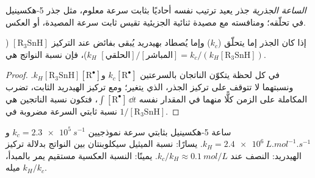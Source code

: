 \begin{definition}\label{def:b3:radicals-carbenes:radical-clock}
\emph{الساعة الجذرية} جذر يعيد ترتيب نفسه
أحاديًا بثابت سرعة معلوم، مثل جذر 5-هكسينيل في
تحلّقه؛ ومنافسته مع مصيدة ثنائية الجزيئية تقيس ثابت سرعة
المصيدة، أو العكس.
\end{definition}

\begin{proposition}\label{prop:b3:radicals-carbenes:clock}
إذا كان الجذر إما يتحلّق ($k_c$) وإما يُصطاد بهيدريد يُبقى بفائض عند
التركيز $[\mathrm{R_3SnH}]$ ($k_H$)، فإن نسبة النواتج هي
$[\text{الحلقي}]/[\text{المباشر}] = k_c/(k_H[\mathrm{R_3SnH}])$.
\end{proposition}

\begin{proof}
في كل لحظة يتكوّن الناتجان بالسرعتين $k_c[\mathrm R^\bullet]$ و$k_H[\mathrm{R_3SnH}][\mathrm R^\bullet]$. ونسبتهما
لا تتوقف على تركيز الجذر، الذي يتغير؛ ومع تركيز الهيدريد
الثابت، تضرب المكاملة على الزمن كلًّا منهما في المقدار نفسه
$\int[\mathrm R^\bullet]\,\dd t$، فتكون نسبة الناتجين هي نسبة ثابتي السرعة
مضروبة في $1/[\mathrm{R_3SnH}]$.
\end{proof}

\begin{omfigure}

{\small ساعة 5-هكسينيل بثابتي سرعة نموذجيين $k_c = \qty{2.3e5}{s^{-1}}$ 
و$k_H = \qty{2.4e6}{L.mol^{-1}.s^{-1}}$. يسارًا: نسبة الميثيل سيكلوبنتان بين النواتج بدلالة
تركيز الهيدريد: النصف عند $k_c/k_H \approx \qty{0.1}{mol/L}$. يمينًا: النسبة العكسية مستقيم
يمر بالمبدأ، ميله $k_H/k_c$.}
\end{omfigure}

